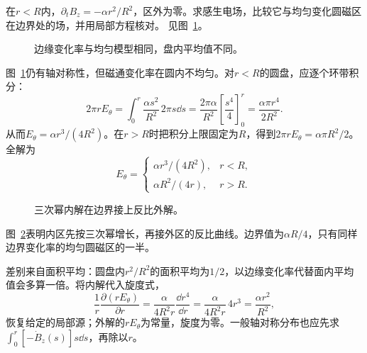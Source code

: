 \begin{exercise}[磁场变化率随半径增大]\label{ex:i1-h3}
在$r<R$内，$\partial_tB_z=-\alpha r^2/R^2$，区外为零。求感生电场，比较它与均匀变化圆磁区在边界处的场，并用局部方程核对。 见图~\ref{fig:i1-h3-q}。
\end{exercise}

\begin{figure}[H]\centering
{}
\caption{边缘变化率与均匀模型相同，盘内平均值不同。}\label{fig:i1-h3-q}
\end{figure}
\begin{solution}
图~\ref{fig:i1-h3-q}仍有轴对称性，但磁通变化率在圆内不均匀。对$r<R$的圆盘，应逐个环带积分：
\[2\pi rE_\theta=\int_0^r\frac{\alpha s^2}{R^2}\,2\pi s\dd s
=\frac{2\pi\alpha}{R^2}\left[\frac{s^4}4\right]_0^r
=\frac{\alpha\pi r^4}{2R^2}.
\]
从而$E_\theta=\alpha r^3/(4R^2)$。在$r>R$时把积分上限固定为$R$，得到$2\pi rE_\theta=\alpha\pi R^2/2$。全解为
\[\boxed{E_\theta=\begin{cases}
\alpha r^3/(4R^2),&r<R,\\
\alpha R^2/(4r),&r>R.
\end{cases}}
\]

\begin{figure}[H]\centering
{}
\caption{三次幂内解在边界接上反比外解。}\label{fig:i1-h3-s}
\end{figure}

图~\ref{fig:i1-h3-s}表明内区先按三次幂增长，再接外区的反比曲线。边界值为$\alpha R/4$，只有同样边界变化率的均匀圆磁区的一半。

差别来自面积平均：圆盘内$r^2/R^2$的面积平均为$1/2$，以边缘变化率代替面内平均值会多算一倍。将内解代入旋度式，
\[\frac1r\frac{\partial(rE_\theta)}{\partial r}
=\frac\alpha{4R^2r}\frac{\dd r^4}{\dd r}
=\frac\alpha{4R^2r}\,4r^3=\frac{\alpha r^2}{R^2},\]
恢复给定的局部源；外解的$rE_\theta$为常量，旋度为零。一般轴对称分布也应先求$\int_0^r[-\dot B_z(s)]s\dd s$，再除以$r$。
\end{solution}

